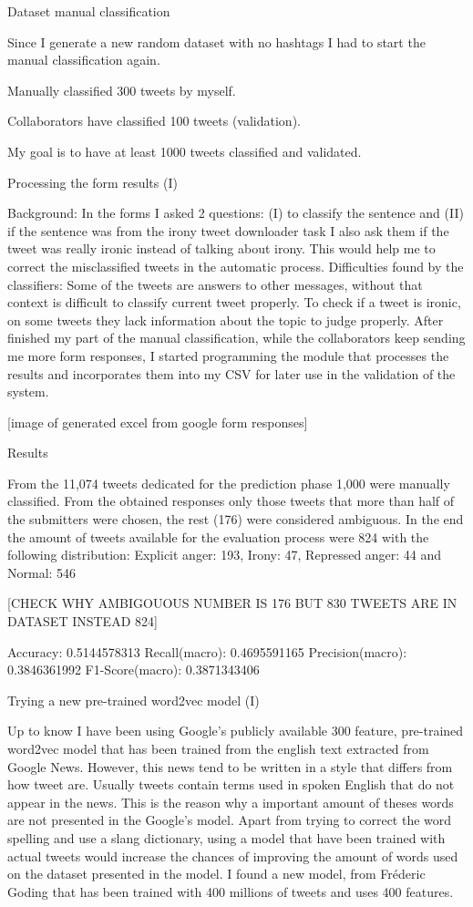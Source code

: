 Dataset manual classification

Since I generate a new random dataset with no hashtags I had to start the manual classification again.

Manually classified 300 tweets by myself. 

Collaborators have classified 100 tweets (validation).

My goal is to have at least 1000 tweets classified and validated.

Processing the form results (I)

Background: In the forms I asked 2 questions: (I) to classify the sentence and (II) if the sentence was from the irony tweet downloader task I also ask them if the tweet was really ironic instead of talking about irony. This would help me to correct the misclassified tweets in the automatic process.
Difficulties found by the classifiers:  
Some of the tweets are answers to other messages, without that context is difficult to classify current tweet properly.
To check if a tweet is ironic, on some tweets they lack information about the topic to judge properly.
After finished my part of the manual classification, while the collaborators keep sending me more form responses, I started programming the module that processes the results and incorporates them into my CSV for later use in the validation of the system.

[image of generated excel from google form responses]

Results

From the 11,074 tweets dedicated for the prediction phase 1,000 were manually classified. From the obtained responses only those tweets that more than half of the submitters were chosen, the rest (176) were considered ambiguous.
In the end the amount of tweets available for the evaluation process were 824 with the following distribution:
Explicit anger: 193, Irony: 47, Repressed anger: 44 and Normal: 546

[CHECK WHY AMBIGOUOUS NUMBER IS 176 BUT 830 TWEETS ARE IN DATASET INSTEAD 824]

Accuracy: 0.5144578313
Recall(macro): 0.4695591165
Precision(macro): 0.3846361992
F1-Score(macro): 0.3871343406

Trying a new pre-trained word2vec model (I)

Up to know I have been using Google’s publicly available 300 feature, pre-trained word2vec model that has been trained from the english text extracted from Google News.
However, this news tend to be written in a style that differs from how tweet are. Usually tweets contain terms used in spoken English that do not appear in the news. This is the reason why a important amount of theses words are not presented in the Google’s model. Apart from trying to correct the word spelling and use a slang dictionary, using a model that have been trained with actual tweets would increase the chances of improving the amount of words used on the dataset presented in the model.
I found a new model, from Fréderic Goding\cite{godin2015multimedia} that has been trained with 400 millions of tweets and uses 400 features.

